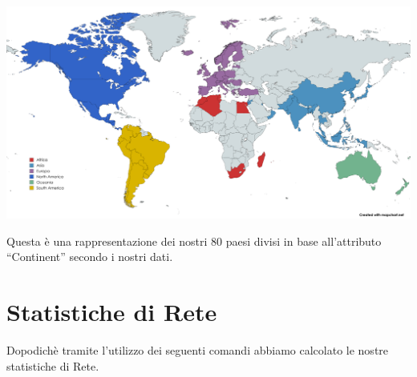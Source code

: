 \documentclass[11pt]{article}
\begin{document}
    \includegraphics{images/MapChart_Map.png}

Questa è una rappresentazione dei nostri 80 paesi divisi in base
all'attributo ``Continent'' secondo i nostri dati.

    \section{Statistiche di Rete}\label{statistiche-di-rete}

Dopodichè tramite l'utilizzo dei seguenti comandi abbiamo calcolato le
nostre statistiche di Rete.
\end{document}
